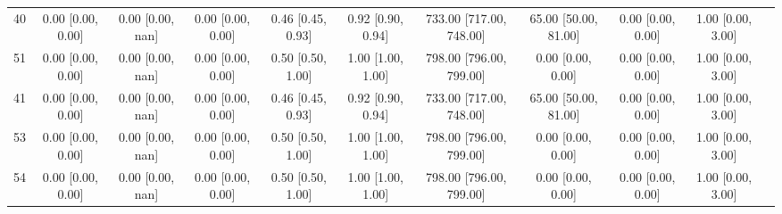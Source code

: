 \documentclass[8pt]{article}
\begin{document}
\begin{center}
\begin{footnotesize}
\begin{longtable}{|ccccccccccc|}
 40 &  0.00 [0.00, 0.00] &  0.00 [0.00, nan] &  0.00 [0.00, 0.00] &  0.46 [0.45, 0.93] &  0.92 [0.90, 0.94] &  733.00 [717.00, 748.00] &  65.00 [50.00, 81.00] &  0.00 [0.00, 0.00] &  1.00 [0.00, 3.00] \\
 51 &  0.00 [0.00, 0.00] &  0.00 [0.00, nan] &  0.00 [0.00, 0.00] &  0.50 [0.50, 1.00] &  1.00 [1.00, 1.00] &  798.00 [796.00, 799.00] &     0.00 [0.00, 0.00] &  0.00 [0.00, 0.00] &  1.00 [0.00, 3.00] \\
 41 &  0.00 [0.00, 0.00] &  0.00 [0.00, nan] &  0.00 [0.00, 0.00] &  0.46 [0.45, 0.93] &  0.92 [0.90, 0.94] &  733.00 [717.00, 748.00] &  65.00 [50.00, 81.00] &  0.00 [0.00, 0.00] &  1.00 [0.00, 3.00] \\
 53 &  0.00 [0.00, 0.00] &  0.00 [0.00, nan] &  0.00 [0.00, 0.00] &  0.50 [0.50, 1.00] &  1.00 [1.00, 1.00] &  798.00 [796.00, 799.00] &     0.00 [0.00, 0.00] &  0.00 [0.00, 0.00] &  1.00 [0.00, 3.00] \\
 54 &  0.00 [0.00, 0.00] &  0.00 [0.00, nan] &  0.00 [0.00, 0.00] &  0.50 [0.50, 1.00] &  1.00 [1.00, 1.00] &  798.00 [796.00, 799.00] &     0.00 [0.00, 0.00] &  0.00 [0.00, 0.00] &  1.00 [0.00, 3.00] \\
\end{longtable}
\end{footnotesize}
\end{center}
\end{document}
